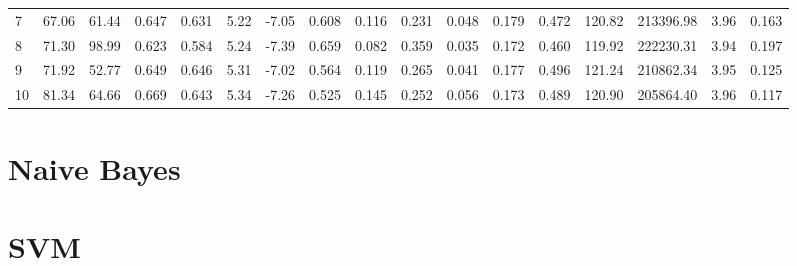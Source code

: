 \begin{itemize}
\begin{table}[ht]
\begin{adjustbox}{width=\textwidth}
\begin{tabular}{lrrrrrrrrrrrrrrrr}
        7  & 67.06 & 61.44 & 0.647 & 0.631 & 5.22 & -7.05 & 0.608 & 0.116 & 0.231 & 0.048 & 0.179 & 0.472 & 120.82 & 213396.98 & 3.96 & 0.163 \\
        8  & 71.30 & 98.99 & 0.623 & 0.584 & 5.24 & -7.39 & 0.659 & 0.082 & 0.359 & 0.035 & 0.172 & 0.460 & 119.92 & 222230.31 & 3.94 & 0.197 \\
        9  & 71.92 & 52.77 & 0.649 & 0.646 & 5.31 & -7.02 & 0.564 & 0.119 & 0.265 & 0.041 & 0.177 & 0.496 & 121.24 & 210862.34 & 3.95 & 0.125 \\
        10 & 81.34 & 64.66 & 0.669 & 0.643 & 5.34 & -7.26 & 0.525 & 0.145 & 0.252 & 0.056 & 0.173 & 0.489 & 120.90 & 205864.40 & 3.96 & 0.117 \\
        \bottomrule
        \end{tabular}
        \end{adjustbox}
        \end{table}
\end{itemize} 



\section{Naive Bayes}

\section{SVM}